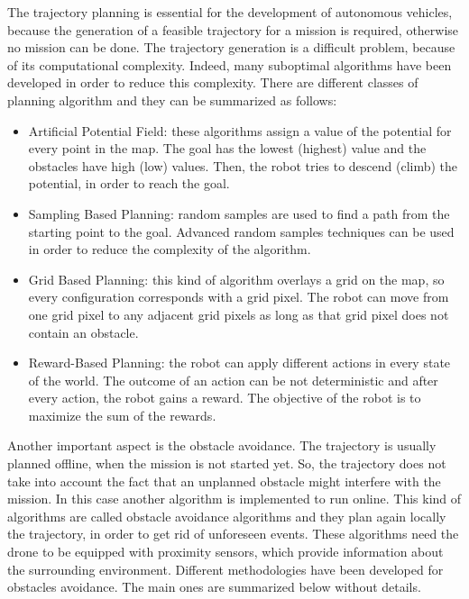 The trajectory planning is essential for the development of autonomous vehicles,
because the generation of a feasible trajectory for a mission is required,
otherwise no mission can be done.
The trajectory generation is a difficult problem, because of its computational complexity.
Indeed, many suboptimal algorithms have been developed in order to reduce this
complexity.
There are different classes of planning algorithm and they can be summarized as follows:
\begin{itemize}
  \item Artificial Potential Field: these algorithms assign a value of the potential
  for every point in the map. The goal has the lowest (highest) value and the obstacles
  have high (low) values. Then, the robot tries to descend (climb) the potential,
  in order to reach the goal.

  \item Sampling Based Planning: random samples are used to find a path from the
  starting point to the goal. Advanced random samples techniques can be used in order
  to reduce the complexity of the algorithm.

  \item Grid Based Planning: this kind of algorithm overlays a grid on the map, so
  every configuration corresponds with a grid pixel.
  The robot can move from one grid pixel to any adjacent grid pixels as long
  as that grid pixel does not contain an obstacle.

  \item Reward-Based Planning: the robot can apply different actions in every state
  of the world. The outcome of an action can be not deterministic and after every
  action, the robot gains a reward. The objective of the robot is to maximize the
  sum of the rewards.
\end{itemize}

Another important aspect is the obstacle avoidance. The trajectory is usually planned
offline, when the mission is not started yet. So, the trajectory does not take into
account the fact that an unplanned obstacle might interfere with the mission. In this
case another algorithm is implemented to run online. This kind of algorithms
are called obstacle avoidance algorithms and they plan again locally the trajectory, in
order to get rid of unforeseen events. These algorithms need the drone to be equipped
with proximity sensors, which provide information about the surrounding environment.
Different methodologies have been developed for obstacles avoidance. The main ones are
summarized below without details.

